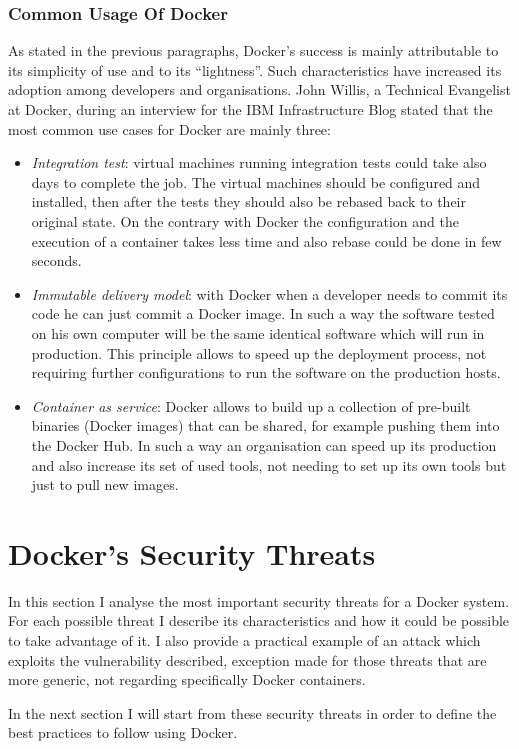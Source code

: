 \documentclass[a4paper,12pt]{article}
\begin{document}
\subsubsection{Common Usage Of Docker}

As stated in the previous paragraphs, Docker's success is mainly attributable to
its simplicity of use and to its ``lightness''. Such characteristics have
increased its adoption among developers and organisations. John Willis, a
Technical Evangelist at Docker, during an interview
\cite{ibm_interview_john_willis} for the IBM Infrastructure Blog stated that the
most common use cases for Docker are mainly three:
\begin{itemize}
  \item \textit{Integration test}: virtual machines running integration
  tests could take also days to complete the job. The virtual machines should be configured and
  installed, then after the tests they should also be rebased back to their
  original state. On the contrary with Docker the configuration and the
  execution of a container takes less time and also rebase could be done in few
  seconds.
  \item \textit{Immutable delivery model}: with Docker when a developer needs to
  commit its code he can just commit a Docker image. In such a way the software
  tested on his own computer will be the same identical software which will run
  in production. This principle allows to speed up the deployment process, not
  requiring further configurations to run the software on the production hosts.
  \item \textit{Container as service}: Docker allows to build up a collection of
  pre-built binaries (Docker images) that can be shared, for example pushing
  them into the Docker Hub. In such a way an organisation can speed up its
  production and also increase its set of used tools, not needing to set up its
  own tools but just to pull new images.
  
\end{itemize}

\newpage

\section{Docker's Security Threats}
\label{sec:docker_security_threats}
 
In this section I analyse the most important security threats for a Docker
system. For each possible threat I describe its characteristics and how it could
be possible to take advantage of it. I also provide a practical example of an
attack which exploits the vulnerability described, exception made for those
threats that are more generic, not regarding specifically Docker containers.
\par In the next section I will start from these security threats in order to
define the best practices to follow using Docker.
\end{document}
